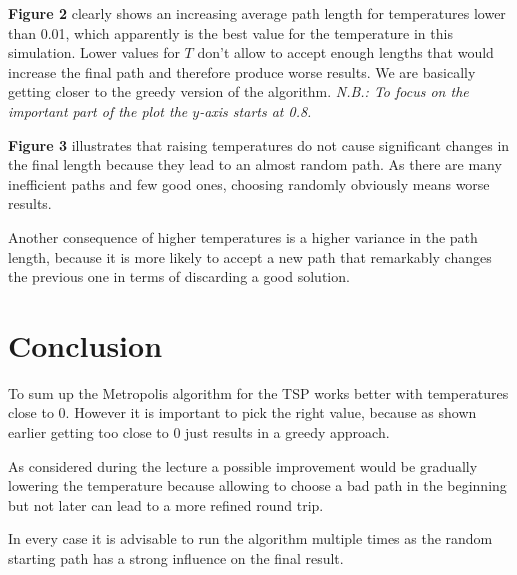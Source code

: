 \documentclass[a4paper]{article}
\begin{document}
\textbf{Figure 2} clearly shows an increasing average path length for temperatures lower than 0.01, which apparently is the best value for the temperature in this simulation. Lower values for \(T\) don't allow to accept enough lengths that would increase the final path and therefore produce worse results. We are basically getting closer to the greedy version of the algorithm. \textit{N.B.: To focus on the important part of the plot the \(y\)-axis starts at 0.8.}

\textbf{Figure 3} illustrates that raising temperatures do not cause significant changes in the final length because they lead to an almost random path. As there are many inefficient paths and few good ones, choosing randomly obviously means worse results.

Another consequence of higher temperatures is a higher variance in the path length, because it is more likely to accept a new path that remarkably changes the previous one in terms of discarding a good solution.


\section{Conclusion}

To sum up the Metropolis algorithm for the \textsc{TSP} works better with temperatures close to 0. However it is important to pick the right value, because as shown earlier getting too close to 0 just results in a greedy approach.

As considered during the lecture a possible improvement would be gradually lowering the temperature because allowing to choose a bad path in the beginning but not later can lead to a more refined round trip.

In every case it is advisable to run the algorithm multiple times as the random starting path has a strong influence on the final result.
\end{document}
